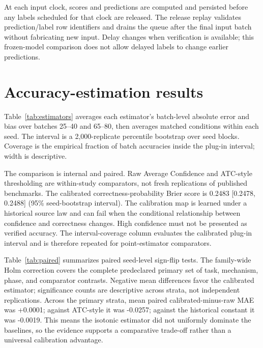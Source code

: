 \documentclass[11pt,a4paper]{article}
\begin{document}
At each input clock, scores and predictions are computed and persisted before any labels scheduled for that clock are released. The release replay validates prediction/label row identifiers and drains the queue after the final input batch without fabricating new input. Delay changes when verification is available; this frozen-model comparison does not allow delayed labels to change earlier predictions.

\section{Accuracy-estimation results}
Table~\ref{tab:estimators} averages each estimator's batch-level absolute error and bias over batches 25--40 and 65--80, then averages matched conditions within each seed. The interval is a 2,000-replicate percentile bootstrap over seed blocks. Coverage is the empirical fraction of batch accuracies inside the plug-in interval; width is descriptive.
\begin{table}[htbp]\centering\small\EstimatorResults\caption{Held-out accuracy estimation, eight-feature primary setting.}\label{tab:estimators}\end{table}

The comparison is internal and paired. Raw Average Confidence and ATC-style thresholding are within-study comparators, not fresh replications of published benchmarks. The calibrated correctness-probability Brier score is 0.2483 [0.2478, 0.2488] (95\% seed-bootstrap interval). The calibration map is learned under a historical source law and can fail when the conditional relationship between confidence and correctness changes. High confidence must not be presented as verified accuracy. The interval-coverage column evaluates the calibrated plug-in interval and is therefore repeated for point-estimator comparators.

Table~\ref{tab:paired} summarizes paired seed-level sign-flip tests. The family-wide Holm correction covers the complete predeclared primary set of task, mechanism, phase, and comparator contrasts. Negative mean differences favor the calibrated estimator; significance counts are descriptive across strata, not independent replications. Across the primary strata, mean paired calibrated-minus-raw MAE was +0.0001; against ATC-style it was -0.0257; against the historical constant it was -0.0019. This means the isotonic estimator did not uniformly dominate the baselines, so the evidence supports a comparative trade-off rather than a universal calibration advantage.
\begin{table}[htbp]\centering\small\PairedResults\caption{Paired primary-setting estimator contrasts; $\Delta$MAE is calibrated minus comparator.}\label{tab:paired}\end{table}
\end{document}
